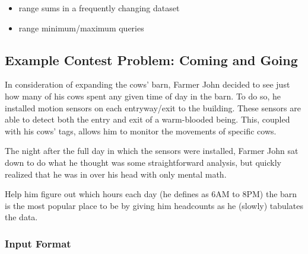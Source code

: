 \begin{itemize}
    \item range sums in a frequently changing dataset
    \item range minimum/maximum queries
\end{itemize}

\subsection{Example Contest Problem: Coming and Going}

In consideration of expanding the cows' barn, Farmer John decided to see just how many of his cows spent any given time of day in the barn.
To do so, he installed motion sensors on each entryway/exit to the building.
These sensors are able to detect both the entry and exit of a warm-blooded being.
This, coupled with his cows' tags, allows him to monitor the movements of specific cows.

The night after the full day in which the sensors were installed, Farmer John sat down to do what he thought was some straightforward analysis, but quickly realized that he was in over his head with only mental math.

Help him figure out which hours each day (he defines as 6AM to 8PM) the barn is the most popular place to be by giving him headcounts as he (slowly) tabulates the data.

\subsubsection{Input Format}

